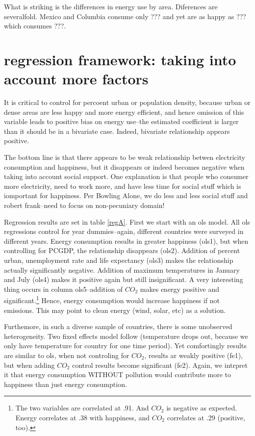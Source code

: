 \documentclass[10pt, letterpaper]{article}
\begin{document}
\begin{spacing}{1.4}
 

What is striking is the differences in energy use by area. Diferences are
severalfold. Mexico and Columbia
consume only ??? and yet are as happy as ??? which consumes ???.


\section{regression framework: taking into account more factors} 


It is critical to control for percoent urban or population density, because
urban or dense areas are less happy and more energy efficient, and hence
omission of this variable leads to positive bias on energy use--the estimated
coefficient   is larger than it should be in a bivariate case. Indeed, bivariate
relationship appears positive. 

The bottom line is that there appears to be weak relationship betwen electricity
consumption and happiness, but it disappears or indeed becomes negative when
taking into account social support. One explanation is that people who consumer
more electricity, need to work more, and have less time for social stuff which
is iomportant for happiness. Per Bowling Alone, we do less and less social stuff
and robert frank--need to focus on non-pecuniary domain!

Regression results are set in table \ref{regA}. First we start with an ols
model. All ols regressions control for year dummies--again, different countries
were surveyed in different years. Energy consumption results in greater
happiness (ols1), but when controlling for PCGDP, the relationship disappears
(ols2). Addition of percent urban, unemployment rate and life expectancy (ols3)
makes the relationship actually significantly negative.  Addition of maximum
temperatures in January and July (ols4) makes it positive again but still
insignificant.  A very interesting thing occurs in column ols5--addition of
$CO_2$ makes energy positive and significant.\footnote{The two variables are
  correlated at .91. And $CO_2$ is negative as expected. Energy correlates at .38
  with happiness, and $CO_2$ correlates at .29 (positive, too).}
 Hence, energy consumption would increase happiness if not emissions. This may
 point to clean energy (wind, solar, etc) as a solution. 

Furthemore, in such a diverse sample of countries, there is some unobserved
heterogeneity. Two fixed effects model follow (temperature drops out, because we
 only have temperature for country for one time period). Yet comfortingly
 results are similar to ols, when not controling for $CO_2$, results ar weakly
 positive (fe1), but when adding $CO_2$ control results become significant
 (fe2). Again, we intrpret it  that energy consumption WITHOUT pollution would
 contribute more to happiness than just energy consumption.  


\end{spacing}
\end{document}
